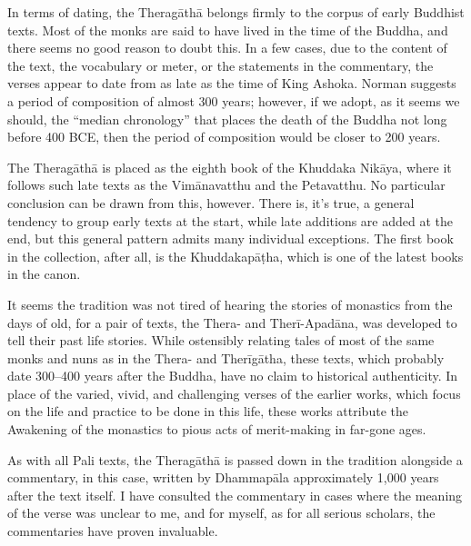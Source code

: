 \documentclass[12pt,openany]{book}%
\begin{document}
In terms of dating, the \textsanskrit{Theragāthā} belongs firmly to the corpus of early Buddhist texts. Most of the monks are said to have lived in the time of the Buddha, and there seems no good reason to doubt this. In a few cases, due to the content of the text, the vocabulary or meter, or the statements in the commentary, the verses appear to date from as late as the time of King Ashoka. Norman suggests a period of composition of almost 300 years; however, if we adopt, as it seems we should, the “median chronology” that places the death of the Buddha not long before 400 BCE, then the period of composition would be closer to 200 years.

The \textsanskrit{Theragāthā} is placed as the eighth book of the Khuddaka \textsanskrit{Nikāya}, where it follows such late texts as the \textsanskrit{Vimānavatthu} and the Petavatthu. No particular conclusion can be drawn from this, however. There is, it’s true, a general tendency to group early texts at the start, while late additions are added at the end, but this general pattern admits many individual exceptions. The first book in the collection, after all, is the \textsanskrit{Khuddakapāṭha}, which is one of the latest books in the canon.

It seems the tradition was not tired of hearing the stories of monastics from the days of old, for a pair of texts, the Thera- and \textsanskrit{Therī}-\textsanskrit{Apadāna}, was developed to tell their past life stories. While ostensibly relating tales of most of the same monks and nuns as in the Thera- and \textsanskrit{Therīgātha}, these texts, which probably date 300–400 years after the Buddha, have no claim to historical authenticity. In place of the varied, vivid, and challenging verses of the earlier works, which focus on the life and practice to be done in this life, these works attribute the Awakening of the monastics to pious acts of merit-making in far-gone ages.

As with all Pali texts, the \textsanskrit{Theragāthā} is passed down in the tradition alongside a commentary, in this case, written by \textsanskrit{Dhammapāla} approximately 1,000 years after the text itself. I have consulted the commentary in cases where the meaning of the verse was unclear to me, and for myself, as for all serious scholars, the commentaries have proven invaluable.
\end{document}

